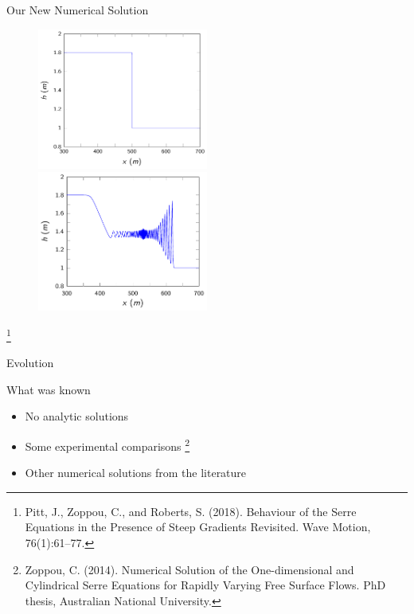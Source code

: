 \documentclass[]{beamer}
\newcommand\blfootnote[1]{%
	\begingroup
	\renewcommand\thefootnote{}\footnote{#1}%
	\addtocounter{footnote}{-1}%
	\endgroup
}
\begin{document}
\begin{frame}{Our New Numerical Solution}
	\begin{figure}
		\includegraphics[width=0.5\textwidth]{./Pics/SteepGradients/DBinit.pdf}
		\pause
		\includegraphics[width=0.5\textwidth]{./Pics/SteepGradients/DBfint.pdf}
	\end{figure}
	\blfootnote{Pitt, J., Zoppou, C., and Roberts, S. (2018).
		Behaviour of the Serre Equations in the Presence of Steep
		Gradients Revisited.
		Wave Motion, 76(1):61–77.}
\end{frame}

\begin{frame}{Evolution}
	\begin{figure}[ht]
	\end{figure}
	
\end{frame}

\begin{frame}{What was known}
	\begin{itemize}
		\item No analytic solutions
		\item Some experimental comparisons \footnote{Zoppou, C. (2014).
			Numerical Solution of the One-dimensional and Cylindrical
			Serre Equations for Rapidly Varying Free Surface Flows. PhD thesis, Australian National University.}
		\item Other numerical solutions from the literature
		\end{itemize}
\end{frame}
\end{document}
